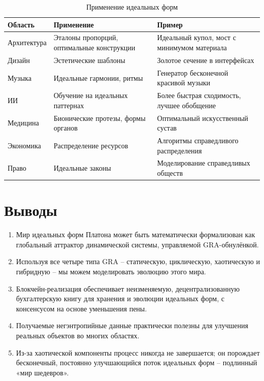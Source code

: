\documentclass[12pt,a4paper]{article}
\begin{document}
\begin{table}[h]
\centering
\caption{Применение идеальных форм}
\label{tab:applications}
\begin{tabular}{|p{3cm}|p{6cm}|p{4cm}|}
\hline
Область & Применение & Пример \\
\hline
Архитектура & Эталоны пропорций, оптимальные конструкции & Идеальный купол, мост с минимумом материала \\
Дизайн & Эстетические шаблоны & Золотое сечение в интерфейсах \\
Музыка & Идеальные гармонии, ритмы & Генератор бесконечной красивой музыки \\
ИИ & Обучение на идеальных паттернах & Более быстрая сходимость, лучшее обобщение \\
Медицина & Бионические протезы, формы органов & Оптимальный искусственный сустав \\
Экономика & Распределение ресурсов & Алгоритмы справедливого распределения \\
Право & Идеальные законы & Моделирование справедливых обществ \\
\hline
\end{tabular}
\end{table}

\section{Выводы}

\begin{enumerate}
    \item Мир идеальных форм Платона может быть математически формализован как глобальный аттрактор динамической системы, управляемой GRA-обнулёнкой.
    \item Используя все четыре типа GRA – статическую, циклическую, хаотическую и гибридную – мы можем моделировать эволюцию этого мира.
    \item Блокчейн-реализация обеспечивает неизменяемую, децентрализованную бухгалтерскую книгу для хранения и эволюции идеальных форм, с консенсусом на основе уменьшения пены.
    \item Получаемые негэнтропийные данные практически полезны для улучшения реальных объектов во многих областях.
    \item Из-за хаотической компоненты процесс никогда не завершается; он порождает бесконечный, постоянно улучшающийся поток идеальных форм – подлинный «мир шедевров».
\end{enumerate}
\end{document}
